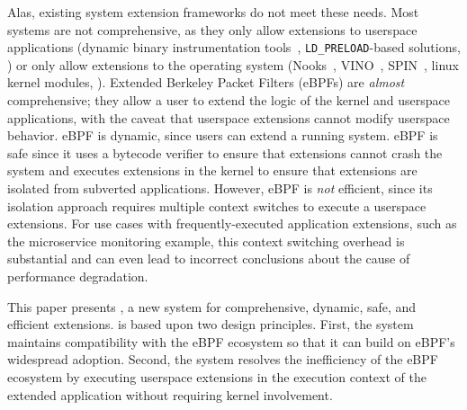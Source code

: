 Alas, existing system extension frameworks do not meet these needs.  Most systems are not comprehensive, as they only allow extensions to userspace applications (\eg dynamic binary instrumentation tools~\cite{Luk05, Nethercote07, Bruening12}, \texttt{LD\_PRELOAD}-based solutions, \etc) or only allow extensions to the operating system (\eg Nooks~\cite{Swift03}, VINO~\cite{Seltzer96}, SPIN~\cite{Bershad95}, linux kernel modules, \etc).   Extended Berkeley Packet Filters (eBPFs) are \emph{almost} comprehensive; they allow a user to extend the logic of the kernel and userspace applications, with the caveat that userspace extensions cannot modify userspace behavior. 
eBPF is dynamic, since users can extend a running system.  eBPF is safe since it uses a bytecode verifier to ensure that extensions cannot crash the system and executes extensions in the kernel to ensure that extensions are isolated from subverted applications.  However, eBPF is \emph{not} efficient, since its isolation approach requires multiple context switches to execute a userspace extensions.  For use cases with frequently-executed application extensions, such as the microservice monitoring example, this context switching overhead is substantial and can even lead to incorrect conclusions about the cause of performance degradation.

This paper presents \sys, a new system for comprehensive, dynamic, safe, and efficient extensions.  \sys{} is based upon two design principles.  First, the system maintains compatibility with the eBPF ecosystem so that it can build on eBPF's widespread adoption.  Second, the system resolves the inefficiency of the eBPF ecosystem by executing userspace extensions in the execution context of the extended application without requiring kernel involvement.  %


